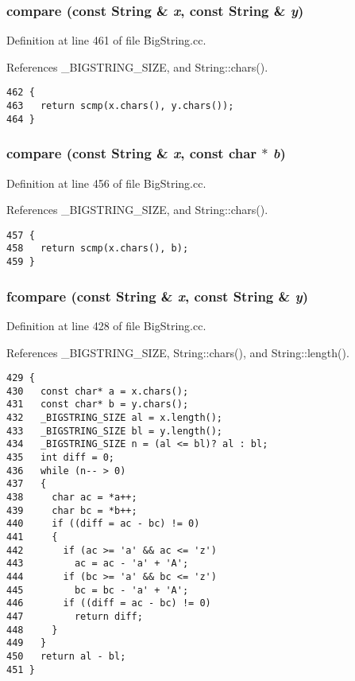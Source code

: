 \subsubsection{ compare (const {\bf String} \& {\em x}, const {\bf String} \& {\em y})}\label{BigString_8cc_a26}




Definition at line 461 of file Big\-String.cc.

References \_\-BIGSTRING\_\-SIZE, and String::chars().



\footnotesize\begin{verbatim}462 {
463   return scmp(x.chars(), y.chars());
464 }
\end{verbatim}\normalsize 
{}
\subsubsection{ compare (const {\bf String} \& {\em x}, const char $\ast$ {\em b})}\label{BigString_8cc_a25}




Definition at line 456 of file Big\-String.cc.

References \_\-BIGSTRING\_\-SIZE, and String::chars().



\footnotesize\begin{verbatim}457 {
458   return scmp(x.chars(), b);
459 }
\end{verbatim}\normalsize 
{}
\subsubsection{ fcompare (const {\bf String} \& {\em x}, const {\bf String} \& {\em y})}\label{BigString_8cc_a24}




Definition at line 428 of file Big\-String.cc.

References \_\-BIGSTRING\_\-SIZE, String::chars(), and String::length().



\footnotesize\begin{verbatim}429 {
430   const char* a = x.chars();
431   const char* b = y.chars();
432   _BIGSTRING_SIZE al = x.length();
433   _BIGSTRING_SIZE bl = y.length();
434   _BIGSTRING_SIZE n = (al <= bl)? al : bl;
435   int diff = 0;
436   while (n-- > 0)
437   {
438     char ac = *a++;
439     char bc = *b++;
440     if ((diff = ac - bc) != 0)
441     {
442       if (ac >= 'a' && ac <= 'z')
443         ac = ac - 'a' + 'A';
444       if (bc >= 'a' && bc <= 'z')
445         bc = bc - 'a' + 'A';
446       if ((diff = ac - bc) != 0)
447         return diff;
448     }
449   }
450   return al - bl;
451 }
\end{verbatim}\normalsize 
{}
